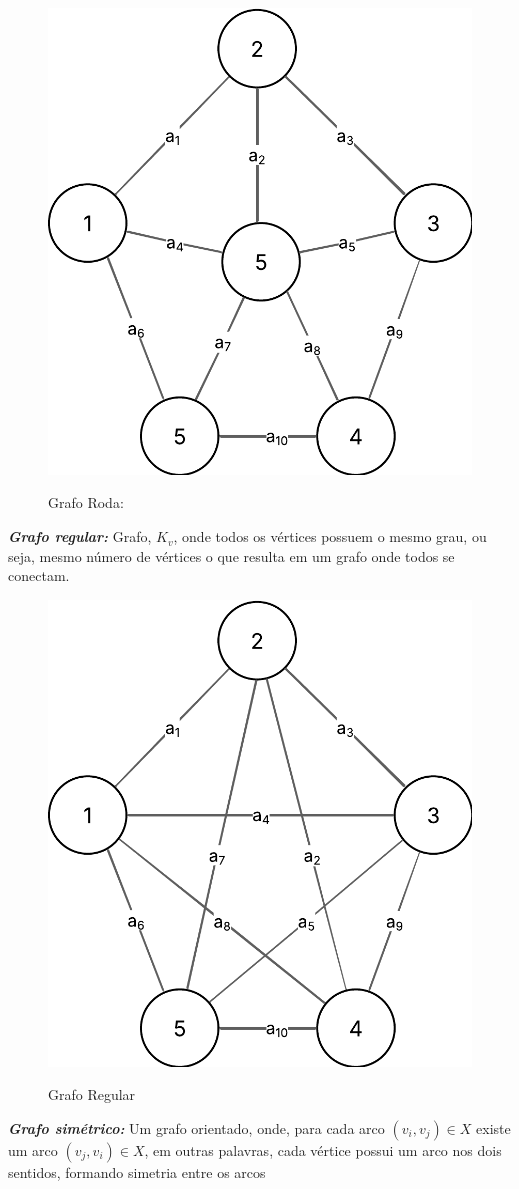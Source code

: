 	\begin{figure} [H]
		\centering
		\caption{Grafo Roda:}%
		\label{fig:grafRoda}%
		\includegraphics[width=0.5\linewidth,angle=0]{figuras/tiposgrafos/grafRoda.png}%
		\\
	\end{figure}
	\textit{\textbf{Grafo regular:}} Grafo, $ K_v $, onde todos os vértices possuem o mesmo grau, ou seja, mesmo número de vértices o que resulta em um grafo onde todos se conectam. \\
	\begin{figure} [H]
		\centering
		\caption{Grafo Regular}%
		\label{fig:grafRegular}%
		\includegraphics[width=0.5\linewidth,angle=0]{figuras/tiposgrafos/grafRegular.png}%
		\\
	\end{figure}
	\textit{\textbf{Grafo simétrico:}} Um grafo orientado, onde, para cada arco $ (v_i, v_j) \in X$ existe um arco $ (v_j,v_i)\in X $, em outras palavras, cada vértice possui um arco nos dois sentidos, formando simetria entre os arcos  \\
